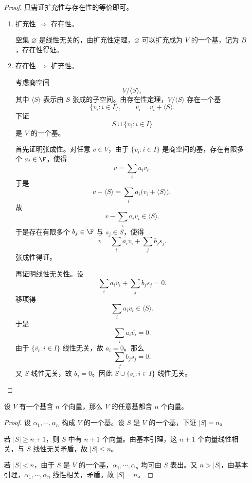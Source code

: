 \begin{proof}
	只需证扩充性与存在性的等价即可。
	\begin{enumerate}
		\item 扩充性 $\Rightarrow$ 存在性。
		
		空集 $\varnothing$ 是线性无关的，由扩充性定理，$\varnothing$ 可以扩充成为 $V$ 的一个基，记为 $B$，存在性得证。
		
		\item 存在性 $\Rightarrow$ 扩充性。
		
		考虑商空间
		\[
		V/\langle S\rangle,
		\]
		其中 $\langle S\rangle$ 表示由 $S$ 张成的子空间。由存在性定理，$V/\langle S\rangle$ 存在一个基
		\[
		\{\overline{v_i}:i\in I\},
		\qquad
		\overline{v_i}=v_i+\langle S\rangle.
		\]
		下证
		\[
		S\cup\{v_i:i\in I\}
		\]
		是 $V$ 的一个基。
		
		首先证明张成性。对任意 $v\in V$，由于 $\{\overline{v_i}:i\in I\}$ 是商空间的基，存在有限多个 $a_i\in\F$，使得
		\[
		\overline{v}=\sum_i a_i\overline{v_i}.
		\]
		于是
		\[
		v+\langle S\rangle
		=\sum_i a_i\bigl(v_i+\langle S\rangle\bigr),
		\]
		故
		\[
		v-\sum_i a_i v_i\in\langle S\rangle.
		\]
		于是存在有限多个 $b_j\in\F$ 与 $s_j\in S$，使得
		\[
		v=\sum_i a_i v_i+\sum_j b_j s_j.
		\]
		张成性得证。
		
		再证明线性无关性。设
		\[
		\sum_i a_i v_i+\sum_j b_j s_j=0.
		\]
		移项得
		\[
		\sum_i a_i v_i\in\langle S\rangle.
		\]
		于是
		\[
		\sum_i a_i\overline{v_i}=0.
		\]
		由于 $\{\overline{v_i}:i\in I\}$ 线性无关，故 $a_i=0$。那么
		\[
		\sum_j b_j s_j=0.
		\]
		又 $S$ 线性无关，故 $b_j=0$。因此 $S\cup\{v_i:i\in I\}$ 线性无关。
	\end{enumerate}
\end{proof}

\begin{lemma}
	设 $V$ 有一个基含 $n$ 个向量，那么 $V$ 的任意基都含 $n$ 个向量。
\end{lemma}

\begin{proof}
	设 $\alpha_1,\cdots,\alpha_n$ 构成 $V$ 的一个基。设 $S$ 是 $V$ 的一个基，下证 $|S|=n$。
	
	若 $|S|\geq n+1$，则 $S$ 中有 $n+1$ 个向量。由基本引理，这 $n+1$ 个向量线性相关，与 $S$ 线性无关矛盾，故 $|S|\leq n$。
	
	若 $|S|<n$，由于 $S$ 是 $V$ 的一个基，$\alpha_1,\cdots,\alpha_n$ 均可由 $S$ 表出。又 $n>|S|$，由基本引理，$\alpha_1,\cdots,\alpha_n$ 线性相关，矛盾。故 $|S|=n$。
\end{proof}

